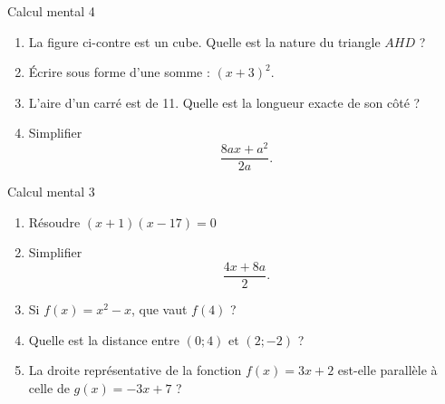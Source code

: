 \documentclass{beamer}
\begin{document}
\begin{frame}{Calcul mental 4}

    \begin{enumerate}
        \item

    \pause
            \begin{multicols}{2}

                La figure ci-contre est un cube. Quelle est la nature du triangle \( AHD\) ?

                \columnbreak

                
            \end{multicols}

        \item
    \pause
            Écrire sous forme d'une somme : $(x+3)^2$.
        \item
            \pause
            L'aire d'un carré est de \unit{11}{\centi\meter\squared}. Quelle est la longueur exacte de son côté ?
        \item
            \pause
            Simplifier 
            \begin{equation}
                \frac{ 8ax+a^2 }{ 2a }.
            \end{equation}
            
    \end{enumerate}
\end{frame}


\begin{frame}{Calcul mental 3}
    \pause
    \begin{enumerate}
        \item
            Résoudre \( (x+1)(x-17)=0\)
            \pause
        \item
            Simplifier
            \begin{equation}
                \frac{ 4x+8a }{ 2 }.
            \end{equation}
            \pause
        \item
            Si \( f(x)=x^2-x\), que vaut \( f(4)\) ?
            \pause
        \item
            Quelle est la distance entre \( (0;4)\) et \( (2;-2)\) ?
            \pause
        \item
            La droite représentative de la fonction \( f(x)=3x+2\) est-elle parallèle à celle de \( g(x)=-3x+7\) ?
    \end{enumerate}
\end{frame}
\end{document}
